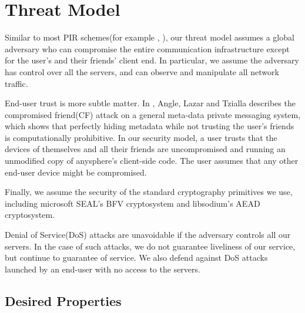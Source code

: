 \section{Threat Model}





Similar to most PIR schemes(for example \cite{ahmad2021addra}, ), our threat model assumes a global adversary who can compromise the entire communication infrastructure except for the user's and their friends' client end. In particular, we assume the adversary has control over all the servers, and can observe and manipulate all network traffic.

End-user trust is more subtle matter. In \cite{angel2018s}, Angle, Lazar and Tzialla describes the compromised friend(CF) attack on a general meta-data private messaging system, which shows that perfectly hiding metadata while not trusting the user's friends is computationally prohibitive. In our security model, a user trusts that the devices of themselves and all their friends are uncompromised and running an unmodified copy of anysphere's client-side code. The user assumes that any other end-user device might be compromised.


Finally, we assume the security of the standard cryptography primitives we use, including microsoft SEAL's BFV cryptosystem and libsodium's AEAD cryptosystem. 

Denial of Service(DoS) attacks are unavoidable if the adversary controls all our servers. In the case of such attacks, we do not guarantee liveliness of our service, but continue to guarantee of service. We also defend against DoS attacks launched by an end-user with no access to the servers.

\subsection{Desired Properties}



